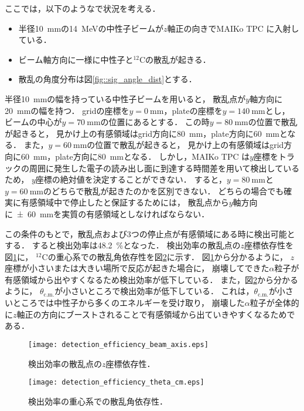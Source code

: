 \documentclass[../master]{subfiles}
\begin{document}
ここでは，以下のようなで状況を考える．
\begin{itemize}
\item
  半径\SI{10}{\milli\metre}の\SI{14}{\mega\electronvolt}の中性子ビームが$z$軸正の向きでMAIKo TPC に入射している．
\item
  ビーム軸方向に一様に中性子と${}^{12}\mathrm{C}$の散乱が起きる．
\item
  散乱の角度分布は図\ref{fig::sig_angle_dist}とする．
\end{itemize}
半径\SI{10}{\milli\metre}の幅を持っている中性子ビームを用いると，
散乱点が$y$軸方向に\SI{20}{\milli\metre}の幅を持つ．
gridの座標を$y = \SI{0}{\milli\metre}$，plateの座標を$y = \SI{140}{\milli\metre}$とし，
ビームの中心が$y = \SI{70}{\milli\metre}$の位置にあるとする．
この時$y = \SI{80}{\milli\metre}$の位置で散乱が起きると，
見かけ上の有感領域はgrid方向に\SI{80}{\milli\metre}，plate方向に\SI{60}{\milli\metre}となる．
また，$y = \SI{60}{\milli\metre}$の位置で散乱が起きると，
見かけ上の有感領域はgrid方向に\SI{60}{\milli\metre}，plate方向に\SI{80}{\milli\metre}となる．
しかし，MAIKo TPC は$y$座標をトラックの周囲に発生した電子の読み出し面に到達する時間差を用いて検出しているため，
$y$座標の絶対値を決定することができない．
すると，$y = \SI{80}{\milli\metre}$と$y = \SI{60}{\milli\metre}$のどちらで散乱が起きたのかを区別できない．
どちらの場合でも確実に有感領域中で停止したと保証するためには，
散乱点から$y$軸方向に\SI{\pm60}{\milli\metre}を実質の有感領域としなければならない．

この条件のもとで，散乱点および3つの停止点が有感領域にある時に検出可能とする．
すると検出効率は\SI{48.2}{\percent}となった．
検出効率の散乱点の$z$座標依存性を図\ref{fig::detection_efficiency_beam_axis}に，
${}^{12}\mathrm{C}$の重心系での散乱角依存性を図\ref{fig::detection_efficiency_theta_cm}に示す．
図\ref{fig::detection_efficiency_beam_axis}から分かるように，
$z$座標が小さいまたは大きい場所で反応が起きた場合に，
崩壊してできた$\alpha$粒子が有感領域から出やすくなるため検出効率が低下している．
また，図\ref{fig::detection_efficiency_theta_cm}から分かるように，
$\theta_{\text{c.m.}}$が小さいところで検出効率が低下している．
これは，$\theta_{\text{c.m.}}$が小さいところでは中性子から多くのエネルギーを受け取り，
崩壊した$\alpha$粒子が全体的に$z$軸正の方向にブーストされることで有感領域から出ていきやすくなるためである．

\begin{figure}
  \centering
  \texttt{[image: detection\_efficiency\_beam\_axis.eps]}
  \caption{検出効率の散乱点の$z$座標依存性．}
  \label{fig::detection_efficiency_beam_axis}
\end{figure}
\begin{figure}
  \centering
  \texttt{[image: detection\_efficiency\_theta\_cm.eps]}
  \caption{検出効率の重心系での散乱角依存性．}
  \label{fig::detection_efficiency_theta_cm}
\end{figure}
\end{document}
